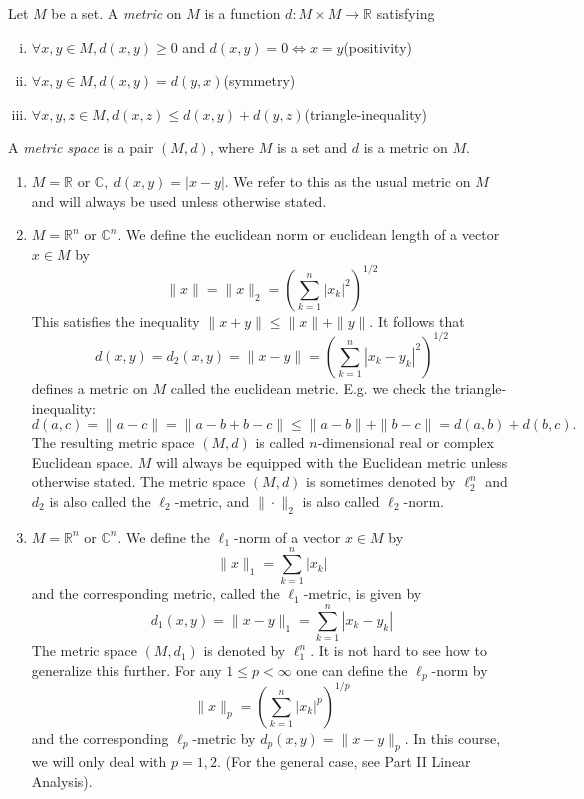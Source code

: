 \documentclass[a4paper]{article}
\begin{document}
\begin{definition}
    Let $M$ be a set. A \textit{metric} on $M$ is a function $d: M \times M \rightarrow \mathbb{R}$ satisfying
    \begin{enumerate}[(i)]
        \item $\forall x, y \in M, d(x, y) \geqslant 0$ and $d(x, y)=0 \Longleftrightarrow x=y$\hfill (positivity)
        \item $\forall x, y \in M, d(x, y)=d(y, x)$\hfill (symmetry)
        \item $\forall x, y, z \in M, d(x, z) \leqslant d(x, y)+d(y, z)$\hfill(triangle-inequality)
    \end{enumerate}
    A \textit{metric space} is a pair $(M, d)$, where $M$ is a set and $d$ is a metric on $M$.
\end{definition}
\begin{example}
    \begin{enumerate}
        \item $M=\mathbb{R}$ or $\mathbb{C},\ d(x, y)=|x-y|$. We refer to this as the usual metric on $M$ and will always be used unless otherwise stated.
        \item $M=\mathbb{R}^{n}$ or $\mathbb{C}^{n} .$ We define the euclidean norm or euclidean length of a vector $x \in M$ by
        \[
        \|x\|=\|x\|_{2}=\left(\sum_{k=1}^{n}\left|x_{k}\right|^{2}\right)^{1 / 2}
        \]
        This satisfies the inequality $\|x+y\| \leqslant\|x\|+\|y\|$. It follows that
        \[
        d(x, y)=d_{2}(x, y)=\|x-y\|=\left(\sum_{k=1}^{n}\left|x_{k}-y_{k}\right|^{2}\right)^{1 / 2}
        \]
        defines a metric on $M$ called the euclidean metric. E.g. we check the triangle-inequality:
        \[
        d(a, c)=\|a-c\|=\|a-b+b-c\| \leqslant\|a-b\|+\|b-c\|=d(a, b)+d(b, c).
        \]
        The resulting metric space $(M, d)$ is called $n$-dimensional real or complex Euclidean space. $M$ will always be equipped with the Euclidean metric unless otherwise stated. The metric space $(M, d)$ is sometimes denoted by $\ell_{2}^{n}$ and $d_{2}$ is also called the $\ell_{2}$-metric, and $\|\cdot\|_{2}$ is also called $\ell_{2}$-norm.
        \item $M=\mathbb{R}^{n}$ or $\mathbb{C}^{n} .$ We define the $\ell_{1}$-norm of a vector $x \in M$ by
        \[
        \|x\|_{1}=\sum_{k=1}^{n}\left|x_{k}\right|
        \]
        and the corresponding metric, called the $\ell_{1}$-metric, is given by
        \[
        d_{1}(x, y)=\|x-y\|_{1}=\sum_{k=1}^{n}\left|x_{k}-y_{k}\right|
        \]
        The metric space $\left(M, d_{1}\right)$ is denoted by $\ell_{1}^{n}$. It is not hard to see how to generalize this further. For any $1 \leqslant p<\infty$ one can define the $\ell_{p}$-norm by
        \[
        \|x\|_{p}=\left(\sum_{k=1}^{n}\left|x_{k}\right|^{p}\right)^{1 / p}
        \]
        and the corresponding $\ell_{p}$-metric by $d_{p}(x, y)=\|x-y\|_{p} .$ In this course, we will only deal with $p=1,2$. (For the general case, see Part II Linear Analysis).


\end{enumerate}
\end{example}
\end{document}
